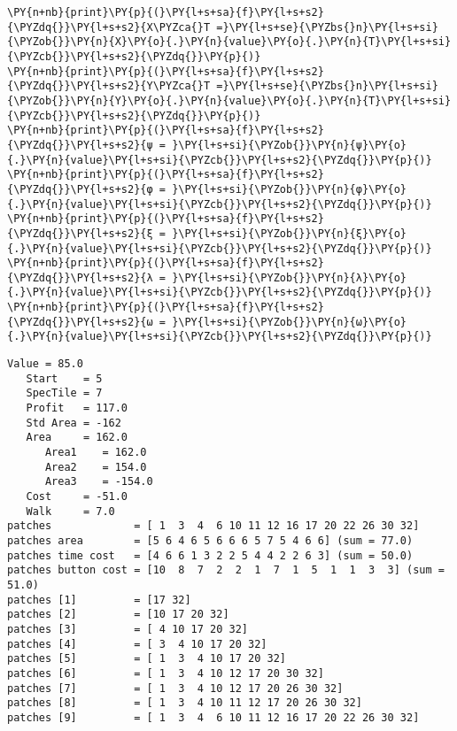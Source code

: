 \begin{tcolorbox}[breakable, size=fbox, boxrule=1pt, pad at break*=1mm,colback=cellbackground, colframe=cellborder]
    \begin{Verbatim}[commandchars=\\\{\}]
\PY{n+nb}{print}\PY{p}{(}\PY{l+s+sa}{f}\PY{l+s+s2}{\PYZdq{}}\PY{l+s+s2}{X\PYZca{}T =}\PY{l+s+se}{\PYZbs{}n}\PY{l+s+si}{\PYZob{}}\PY{n}{X}\PY{o}{.}\PY{n}{value}\PY{o}{.}\PY{n}{T}\PY{l+s+si}{\PYZcb{}}\PY{l+s+s2}{\PYZdq{}}\PY{p}{)}
\PY{n+nb}{print}\PY{p}{(}\PY{l+s+sa}{f}\PY{l+s+s2}{\PYZdq{}}\PY{l+s+s2}{Y\PYZca{}T =}\PY{l+s+se}{\PYZbs{}n}\PY{l+s+si}{\PYZob{}}\PY{n}{Y}\PY{o}{.}\PY{n}{value}\PY{o}{.}\PY{n}{T}\PY{l+s+si}{\PYZcb{}}\PY{l+s+s2}{\PYZdq{}}\PY{p}{)}
\PY{n+nb}{print}\PY{p}{(}\PY{l+s+sa}{f}\PY{l+s+s2}{\PYZdq{}}\PY{l+s+s2}{ψ = }\PY{l+s+si}{\PYZob{}}\PY{n}{ψ}\PY{o}{.}\PY{n}{value}\PY{l+s+si}{\PYZcb{}}\PY{l+s+s2}{\PYZdq{}}\PY{p}{)}
\PY{n+nb}{print}\PY{p}{(}\PY{l+s+sa}{f}\PY{l+s+s2}{\PYZdq{}}\PY{l+s+s2}{φ = }\PY{l+s+si}{\PYZob{}}\PY{n}{φ}\PY{o}{.}\PY{n}{value}\PY{l+s+si}{\PYZcb{}}\PY{l+s+s2}{\PYZdq{}}\PY{p}{)}
\PY{n+nb}{print}\PY{p}{(}\PY{l+s+sa}{f}\PY{l+s+s2}{\PYZdq{}}\PY{l+s+s2}{ξ = }\PY{l+s+si}{\PYZob{}}\PY{n}{ξ}\PY{o}{.}\PY{n}{value}\PY{l+s+si}{\PYZcb{}}\PY{l+s+s2}{\PYZdq{}}\PY{p}{)}
\PY{n+nb}{print}\PY{p}{(}\PY{l+s+sa}{f}\PY{l+s+s2}{\PYZdq{}}\PY{l+s+s2}{λ = }\PY{l+s+si}{\PYZob{}}\PY{n}{λ}\PY{o}{.}\PY{n}{value}\PY{l+s+si}{\PYZcb{}}\PY{l+s+s2}{\PYZdq{}}\PY{p}{)}
\PY{n+nb}{print}\PY{p}{(}\PY{l+s+sa}{f}\PY{l+s+s2}{\PYZdq{}}\PY{l+s+s2}{ω = }\PY{l+s+si}{\PYZob{}}\PY{n}{ω}\PY{o}{.}\PY{n}{value}\PY{l+s+si}{\PYZcb{}}\PY{l+s+s2}{\PYZdq{}}\PY{p}{)}
    \end{Verbatim}
\end{tcolorbox}

\vspace*{-0.25cm}


\fontsize{8.75}{10.5}\selectfont %

\begin{Verbatim}[commandchars=\\\{\}]
Value = 85.0
   Start    = 5
   SpecTile = 7
   Profit   = 117.0
   Std Area = -162
   Area     = 162.0
      Area1    = 162.0
      Area2    = 154.0
      Area3    = -154.0
   Cost     = -51.0
   Walk     = 7.0
patches             = [ 1  3  4  6 10 11 12 16 17 20 22 26 30 32]
patches area        = [5 6 4 6 5 6 6 6 5 7 5 4 6 6] (sum = 77.0)
patches time cost   = [4 6 6 1 3 2 2 5 4 4 2 2 6 3] (sum = 50.0)
patches button cost = [10  8  7  2  2  1  7  1  5  1  1  3  3] (sum = 51.0)
patches [1]         = [17 32]
patches [2]         = [10 17 20 32]
patches [3]         = [ 4 10 17 20 32]
patches [4]         = [ 3  4 10 17 20 32]
patches [5]         = [ 1  3  4 10 17 20 32]
patches [6]         = [ 1  3  4 10 12 17 20 30 32]
patches [7]         = [ 1  3  4 10 12 17 20 26 30 32]
patches [8]         = [ 1  3  4 10 11 12 17 20 26 30 32]
patches [9]         = [ 1  3  4  6 10 11 12 16 17 20 22 26 30 32]
\end{Verbatim}

